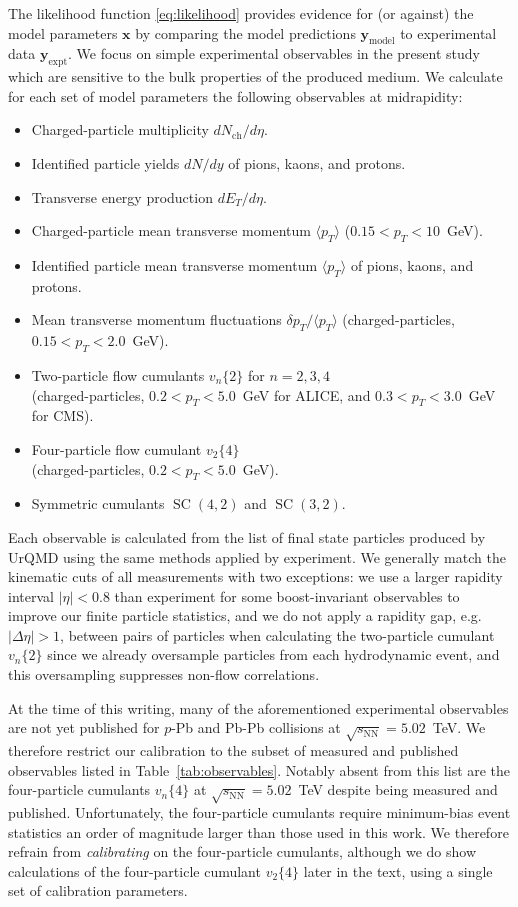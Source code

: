 \documentclass[aps,prc,reprint,amsmath,nofootinbib]{revtex4-1}
\newcommand{\sqrts}{\sqrt{s_\mathrm{NN}}}
\newcommand{\nch}{N_\text{ch}}
\newcommand{\vnk}[2]{v_#1\{#2\}}
\newcommand{\xv}{\mathbf x}
\newcommand{\ym}{{\mathbf y}_\text{model}}
\newcommand{\ye}{{\mathbf y}_\text{expt}}
\DeclareMathOperator{\SC}{SC}
\begin{document}
The likelihood function \eqref{eq:likelihood} provides evidence for (or against) the model parameters $\xv$ by comparing the model predictions $\ym$ to experimental data $\ye$.
We focus on simple experimental observables in the present study which are sensitive to the bulk properties of the produced medium.
We calculate for each set of model parameters the following observables at midrapidity:
\begin{itemize}[leftmargin=1\parindent, itemsep=0pt]
  \item Charged-particle multiplicity $d\nch/d\eta$.
  \item Identified particle yields $dN/dy$ of pions, kaons, and protons.
  \item Transverse energy production $dE_T/d\eta$.
  \item Charged-particle mean transverse momentum $\langle p_T \rangle$ ($0.15 < p_T < 10$~GeV).
  \item Identified particle mean transverse momentum $\langle p_T \rangle$ of pions, kaons, and protons.
  \item Mean transverse momentum fluctuations $\delta p_T / \langle p_T \rangle$ (charged-particles, $0.15 < p_T < 2.0$~GeV).
  \item Two-particle flow cumulants $\vnk{n}{2}$ for $n=2,3,4$\\ (charged-particles, $0.2 < p_T < 5.0$~GeV for ALICE, and $0.3 < p_T < 3.0$~GeV for CMS).
  \item Four-particle flow cumulant $\vnk{2}{4}$ \\(charged-particles, $0.2 < p_T < 5.0$~GeV).
  \item Symmetric cumulants $\SC(4, 2)$ and $\SC(3,2)$.
\end{itemize}
Each observable is calculated from the list of final state particles produced by UrQMD using the same methods applied by experiment.
We generally match the kinematic cuts of all measurements with two exceptions: we use a larger rapidity interval $|\eta| < 0.8$ than experiment for some boost-invariant observables to improve our finite particle statistics, and we do not apply a rapidity gap, e.g.\ $|\Delta \eta| > 1$, between pairs of particles when calculating the two-particle cumulant $\vnk{n}{2}$ since we already oversample particles from each hydrodynamic event, and this oversampling suppresses non-flow correlations.

At the time of this writing, many of the aforementioned experimental observables are not yet published for $p$-Pb and Pb-Pb collisions at $\sqrts=5.02$~TeV.
We therefore restrict our calibration to the subset of measured and published observables listed in Table~\ref{tab:observables}.
Notably absent from this list are the four-particle cumulants $\vnk{n}{4}$ at $\sqrts=5.02$~TeV despite being measured and published.
Unfortunately, the four-particle cumulants require minimum-bias event statistics an order of magnitude larger than those used in this work.
We therefore refrain from \emph{calibrating} on the four-particle cumulants, although we do show calculations of the four-particle cumulant $\vnk{2}{4}$ later in the text, using a single set of calibration parameters.
\end{document}
